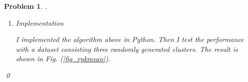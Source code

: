 \documentclass[12pt]{article}
\newtheorem{hw}{Problem}
\newenvironment{sol}
  {\par\vspace{3mm}\noindent{\it Solution}.}
  {\qed}
\begin{document}
\begin{hw}
\begin{sol}
\begin{enumerate}
{			The algorithm is described in detail with pseudo code in the appendix B.
		}
		\item[(3)]{ 
			Implementation
			
			I implemented the algorithm above in Python. Then I test the performance with a dataset consisting three randomly generated clusters. The result is shown in Fig. (\ref{fig_rpkmean}).
			\begin{figure}[ht]
				\centering
\end{figure}}
\end{enumerate}
\end{sol}
\end{hw}
\end{document}
